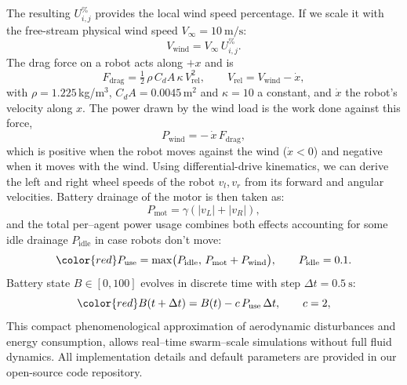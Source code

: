 The resulting $U^\%_{i,j}$ provides the local wind speed percentage. If we scale it with the free-stream physical wind speed $V_\infty = 10~\text{m/s}$:
\begin{equation}
V_{\text{wind}} = V_\infty\,U^\%_{i,j}.
\label{eq:vwind_compact}
\end{equation}
\begingroup\color{red}The drag force on a robot acts along $+x$ and is
\begin{equation}
F_{\text{drag}} = \tfrac{1}{2}\,\rho\,C_dA\,\kappa\,V_{\text{rel}}^{2}, \qquad V_{\text{rel}} = V_{\text{wind}} - \dot{x},
\label{eq:fdrag_compact}
\end{equation}
with $\rho = 1.225$\,kg/m$^3$, $C_dA = 0.0045$\,m$^2$ and $\kappa = 10$ a constant, and $\dot{x}$ the robot's velocity along $x$. The power drawn by the wind load is the work done against this force,
\begin{equation}
P_{\text{wind}} = -\,\dot{x}\,F_{\text{drag}},
\label{eq:pwind_compact}
\end{equation}
which is positive when the robot moves against the wind ($\dot{x} < 0$) and negative when it moves with the wind.\endgroup{} Using differential-drive kinematics, we can derive the left and right wheel speeds of the robot $v_l, v_r$ from its forward and angular velocities. Battery drainage of the motor is then taken as:
\begin{equation}
P_{\text{mot}} = \gamma(|v_L| + |v_R|),
\label{eq:pmot_compact}
\end{equation}
 and the total per–agent power usage combines both effects accounting for some idle drainage $P_{\text{idle}}$ in case robots don't move:
\begin{equation}
\color{red}
P_{\text{use}} = \max\!\big(P_{\text{idle}},\, P_{\text{mot}} + P_{\text{wind}}\big),
\qquad P_{\text{idle}} = 0.1.
\label{eq:puse_compact}
\end{equation}
 Battery state $B\in[0,100]$ evolves in discrete time with step
$\Delta t=0.5~\text{s}$:
\begin{equation}
\color{red}
B(t+\Delta t)=B(t)-c\,P_{\text{use}}\,\Delta t, \qquad c = 2,
\label{eq:battery_compact}
\end{equation}
This compact phenomenological approximation of aerodynamic disturbances and energy consumption, allows real–time swarm–scale simulations without full fluid dynamics. All implementation details and default parameters are provided in our open-source code repository.



